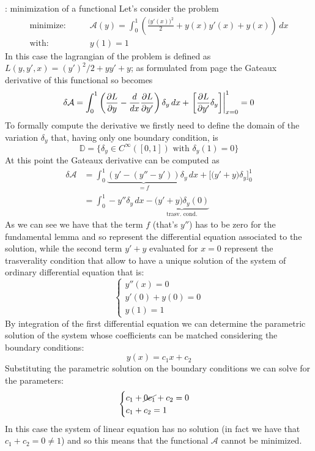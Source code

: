 	\begin{example}{: minimization of a functional}
		Let's consider the problem
		\begin{align*}
			\textrm{minimize:}& \qquad \mathcal A(y) = \int_0^1 \left( \frac{\big(y'(x)\big)^2}{2} + y(x)y'(x) + y(x) \right)\, dx \\
			\textrm{with:}& \qquad y(1) = 1
		\end{align*}
		In this case the lagrangian of the problem is defined as $L (y,y',x) = (y')^2/2 + y y' + y$; as formulated from page \pageref{sec:func:eullag} the Gateaux derivative of this functional so becomes
		\[ \delta \mathcal A = \int_0^1 \left( \frac{\partial L }{\partial y} - \frac{d}{dx} \frac{\partial L }{\partial y'} \right)\delta_y\, dx + \left. \left[ \frac{\partial L }{\partial y'} \delta_y\right] \right|_{x = 0}^1 = 0 \]
		To formally compute the derivative we firstly need to define the domain of the variation $\delta_y$ that, having only one boundary condition, is
		\[ \mathds D = \{ \delta_y \in C^\infty([0,1]) \textrm{ with } \delta_y(1) = 0\} \]
		At this point the Gateaux derivative can be computed as
		\begin{align*}
			\delta \mathcal A & = \int_0^1 \underbrace{\left( y' - (y'' - y') \right) }_{=f} \delta_y \, dx + \Big[ \big(y'+y\big) \delta_y \Big]_0^1 \\
			& = \int_0^1 -y'' \delta_y\, dx - \underbrace{\big(y'+y\big)\delta_y(0)}_\textrm{trasv. cond.}
		\end{align*}
		As we can see we have that the term $f$ (that's $y''$) has to be zero for the fundamental lemma and so represent the differential equation associated to the solution, while the second term $y'+y$ evaluated for $x = 0$ represent the trasverality condition that allow to have a unique solution of the system of ordinary differential equation that is:
		\[ \begin{cases}
			y''(x) = 0 \\ 
			y'(0) + y(0) = 0 \\
			y(1) = 1
		\end{cases} \]
		By integration of the first differential equation we can determine the parametric solution of the system whose coefficients can be matched considering the boundary conditions:
		\[ y(x) = c_1x + c_2 \]
		Substituting the parametric solution on the boundary conditions we can solve for the parameters:
		\[ \begin{cases}
			c_1 + \cancel{0c_1} + c_2 = 0 \\ c_1+c_2 = 1
		\end{cases} \]
		In this case the system of linear equation has no solution (in fact we have that $c_1 + c_2 = 0 \neq 1$) and so this means that the functional $\mathcal A$ cannot be minimized.
		
	\end{example}
	
